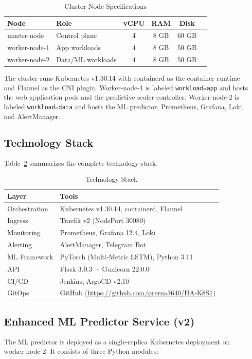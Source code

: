 \documentclass[journal]{IEEEtran}
\begin{document}
\begin{table}[h]
\centering
\caption{Cluster Node Specifications}
\label{tab:cluster}
\begin{tabular}{@{}llcccc@{}}
\toprule
\textbf{Node} & \textbf{Role} & \textbf{vCPU} & \textbf{RAM} & \textbf{Disk} \\
\midrule
master-node & Control plane & 4 & 8 GB & 60 GB \\
worker-node-1 & App workloads & 4 & 8 GB & 50 GB \\
worker-node-2 & Data/ML workloads & 4 & 8 GB & 50 GB \\
\bottomrule
\end{tabular}
\end{table}

The cluster runs Kubernetes v1.30.14 with containerd as the container runtime and Flannel as the CNI plugin. Worker-node-1 is labeled \texttt{workload=app} and hosts the web application pods and the predictive scaler controller. Worker-node-2 is labeled \texttt{workload=data} and hosts the ML predictor, Prometheus, Grafana, Loki, and AlertManager.

\subsection{Technology Stack}
Table~\ref{tab:stack} summarizes the complete technology stack.

\begin{table}[h]
\centering
\caption{Technology Stack}
\label{tab:stack}
\begin{tabular}{@{}ll@{}}
\toprule
\textbf{Layer} & \textbf{Tools} \\
\midrule
Orchestration & Kubernetes v1.30.14, containerd, Flannel \\
Ingress & Traefik v2 (NodePort 30080) \\
Monitoring & Prometheus, Grafana 12.4, Loki \\
Alerting & AlertManager, Telegram Bot \\
ML Framework & PyTorch (Multi-Metric LSTM), Python 3.11 \\
API & Flask 3.0.3 + Gunicorn 22.0.0 \\
CI/CD & Jenkins, ArgoCD v2.10 \\
GitOps & GitHub (\url{https://github.com/prerna3640/HA-K8S1}) \\
\bottomrule
\end{tabular}
\end{table}

\subsection{Enhanced ML Predictor Service (v2)}
The ML predictor is deployed as a single-replica Kubernetes deployment on worker-node-2. It consists of three Python modules:
\end{document}
